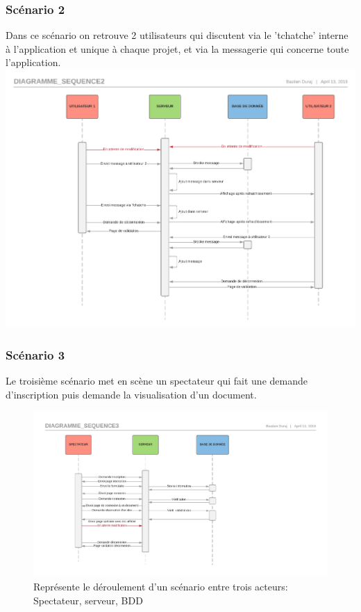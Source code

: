 \documentclass[11pt,a4paper]{article}
\begin{document}
\subsubsection{Scénario 2}
Dans ce scénario on retrouve 2 utilisateurs qui discutent via le 'tchatche' interne à l'application et unique à chaque projet, et via la messagerie qui concerne toute l'application.
\includegraphics[scale=0.5]{Image/Diagramme_sequence2.pdf}

\subsubsection{Scénario 3}
Le troisième scénario met en scène un spectateur qui fait une demande d'inscription puis demande la visualisation d'un document.
\begin{figure}[!h]
\centering
\includegraphics[scale=0.5]{Image/Diagramme_sequence3.pdf}
\caption{Représente le déroulement d'un scénario entre trois acteurs: Spectateur, serveur, BDD}
\end{figure}
\end{document}
